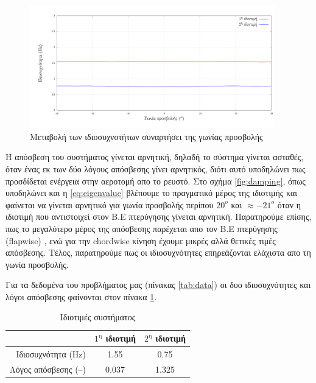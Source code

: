 \begin{figure}
    \begin{center}
        \includegraphics[width=0.95\textwidth]{./figures/aoa_vs_freq.pdf}
    \end{center}
    \caption{Μεταβολή των ιδιοσυχνοτήτων συναρτήσει της γωνίας προσβολής}
    \label{fig:frequency}
\end{figure}

Η απόσβεση του συστήματος γίνεται αρνητική, δηλαδή το σύστημα γίνεται ασταθές, όταν ένας εκ των δύο λόγους απόσβεσης γίνει αρνητικός, διότι αυτό υποδηλώνει πως προσδίδεται ενέργεια στην αεροτομή απο το ρευστό. Στο σχήμα \ref{fig:damping}, όπως υποδηλώνει και η \cref{eq:eigenvalue} βλέπουμε το πραγματικό μέρος της ιδιοτιμής και φαίνεται να γίνεται αρνητικό για γωνία προσβολής περίπου $20^o$ και $\approx-21^o$ όταν η ιδιοτιμή που αντιστοιχεί στον Β.Ε πτερύγησης γίνεται αρνητική. Παρατηρούμε επίσης, πως το μεγαλύτερο μέρος της απόσβεσης παρέχεται απο τον Β.Ε πτερύγησης (flapwise) , ενώ για την chordwise κίνηση έχουμε μικρές αλλά θετικές τιμές απόσβεσης. Τέλος, παρατηρούμε πως οι ιδιοσυχνότητες επηρεάζονται ελάχιστα απο τη γωνία προσβολής.

Για τα δεδομένα του προβλήματος μας (πίνακας \ref{tab:data}) οι δυο ιδιοσυχνότητες και λόγοι απόσβεσης φαίνονται στον πίνακα \ref{tab:res}.

\begin{table}[ht!]
    \begin{center}
        \begin{tabular}[c]{|r|c|c|}
            \hline
            ~ & $1^{\text{η}}$ ιδιοτιμή & $2^{\text{η}}$ ιδιοτιμή\\
            \hline
            Ιδιοσυχνότητα (Hz) & 1.55 & 0.75 \\
            Λόγος απόσβεσης (--) & 0.037 & 1.325 \\
            \hline
        \end{tabular}
    \caption{Ιδιοτιμές συστήματος}
    \label{tab:res}
    \end{center}
\end{table}


